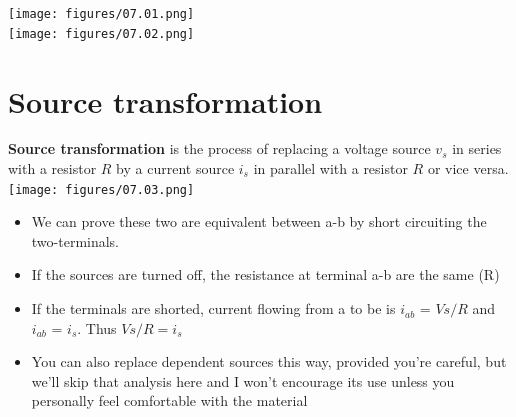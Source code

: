 \documentclass[11pt]{book}
\begin{document}
\texttt{[image: figures/07.01.png]} \\
\texttt{[image: figures/07.02.png]}


\section{Source transformation}
\textbf{Source transformation} is the process of replacing a voltage source $v_s$ in series with a resistor $R$ by a current source $i_s$ in parallel with a resistor $R$ or vice versa.
\texttt{[image: figures/07.03.png]}

\begin{itemize}
	\item We can prove these two are equivalent between a-b by short circuiting the two-terminals.
	\item If the sources are turned off, the resistance at terminal a-b are the same (R)
	\item If the terminals are shorted, current flowing from a to be is $i_{ab}$ = $Vs/R$ and $i_{ab}$ = $i_s$. Thus $Vs/R = i_s$
	\item You can also replace dependent sources this way, provided you’re careful, but we’ll skip that analysis here and I won’t encourage its use unless you personally feel comfortable with the material
\end{itemize}
\end{document}

